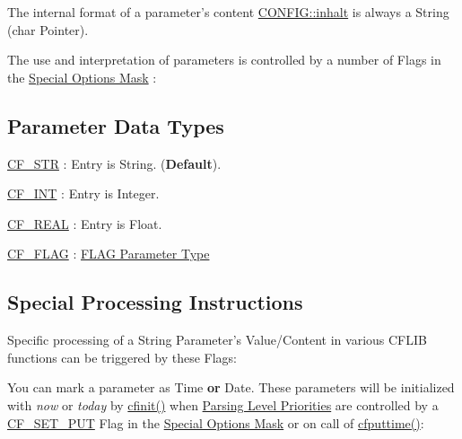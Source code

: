 The internal format of a parameter's content \hyperlink{struct_c_o_n_f_i_g_ab8cae13203b07fabaa40e407fa8dbdfb}{C\-O\-N\-F\-I\-G\-::inhalt} is always a String (char Pointer).

The use and interpretation of parameters is controlled by a number of Flags in the \hyperlink{group__special__options__mask}{Special Options Mask} \-:\hypertarget{parameter_types_parameter_datatypes}{}\subsection{Parameter Data Types}\label{parameter_types_parameter_datatypes}

\begin{DoxyItemize}
\item \hyperlink{group__special__options__mask_ga64c30a2865061d0c1074bc6ec91e3dcf}{C\-F\-\_\-\-S\-T\-R} \-: Entry is String.  ({\bfseries Default}).
\item \hyperlink{group__special__options__mask_gab33869d596619ad14675c053925a42e0}{C\-F\-\_\-\-I\-N\-T} \-: Entry is Integer. 
\item \hyperlink{group__special__options__mask_gaeefdbef320cbd7179f1fb0ebe0fcf5ce}{C\-F\-\_\-\-R\-E\-A\-L} \-: Entry is Float. 
\item \hyperlink{group__special__options__mask_ga1d1f1d1b6eac6b5d9970102318ab2667}{C\-F\-\_\-\-F\-L\-A\-G} \-: \hyperlink{parameter_types_parameter_type_flag}{F\-L\-A\-G Parameter Type}
\end{DoxyItemize}\hypertarget{parameter_types_processing_instructions}{}\subsection{Special Processing Instructions}\label{parameter_types_processing_instructions}
Specific processing of a String Parameter's Value/\-Content in various C\-F\-L\-I\-B functions can be triggered by these Flags\-:

You can mark a parameter as Time {\bfseries or} Date. These parameters will be initialized with {\itshape now\/} or {\itshape today\/} by \hyperlink{group__cflib__core_ga64fb341565c2ddfccd6669e5e6265a8a}{cfinit()} when \hyperlink{config_levels_parsing_level_priorities}{Parsing Level Priorities} are controlled by a \hyperlink{group__special__options__mask_ga8d6cd1608fef5638efe964da63edf2dd}{C\-F\-\_\-\-S\-E\-T\-\_\-\-P\-U\-T} Flag in the \hyperlink{group__special__options__mask}{Special Options Mask} or on call of \hyperlink{group__setting__saving_ga6f133f88dc253a6a80d13eed4d123063}{cfputtime()}\-:


